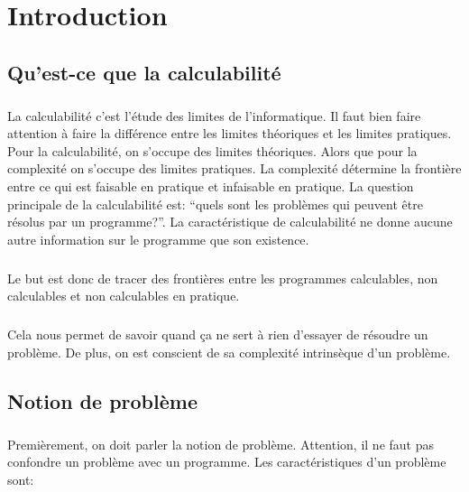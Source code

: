 
\chapter{Introduction}
\label{sec:introduction}

\section{Qu'est-ce que la calculabilité}
\paragraph{}

La calculabilité c'est l'étude des limites de l'informatique. Il faut bien
faire attention à faire la différence entre les limites théoriques et les limites
pratiques. Pour la calculabilité, on s'occupe des limites théoriques.
Alors que pour la complexité on s'occupe des limites pratiques. La complexité
détermine la frontière entre ce qui est faisable en pratique et infaisable en pratique.
La question principale de la calculabilité est: ``quels sont les problèmes qui peuvent
être résolus par un programme?''. La caractéristique de calculabilité ne donne aucune autre information sur le programme que son existence.

\paragraph{} Le but est donc de tracer des frontières entre les programmes calculables,
non calculables et non calculables en pratique.

\paragraph{}
Cela nous permet de savoir quand ça ne sert à rien d'essayer de résoudre un problème.
De plus, on est conscient de sa complexité intrinsèque d'un
problème.


\section{Notion de problème}
\label{subsec:notion_de_probl_me}

\paragraph{}
Premièrement, on doit parler la notion de problème.
Attention, il ne faut pas confondre un problème avec un programme.
Les caractéristiques d'un problème sont:

